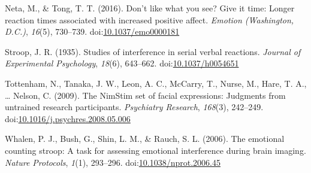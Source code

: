 \documentclass[man]{apa6}
\begin{document}
\leavevmode\hypertarget{ref-neta_dont_2016}{}%
Neta, M., \& Tong, T. T. (2016). Don't like what you see? Give it time: Longer reaction times associated with increased positive affect. \emph{Emotion (Washington, D.C.)}, \emph{16}(5), 730--739. doi:\href{https://doi.org/10.1037/emo0000181}{10.1037/emo0000181}

\leavevmode\hypertarget{ref-stroop_studies_1935}{}%
Stroop, J. R. (1935). Studies of interference in serial verbal reactions. \emph{Journal of Experimental Psychology}, \emph{18}(6), 643--662. doi:\href{https://doi.org/10.1037/h0054651}{10.1037/h0054651}

\leavevmode\hypertarget{ref-tottenham_nimstim_2009}{}%
Tottenham, N., Tanaka, J. W., Leon, A. C., McCarry, T., Nurse, M., Hare, T. A., \ldots{} Nelson, C. (2009). The NimStim set of facial expressions: Judgments from untrained research participants. \emph{Psychiatry Research}, \emph{168}(3), 242--249. doi:\href{https://doi.org/10.1016/j.psychres.2008.05.006}{10.1016/j.psychres.2008.05.006}

\leavevmode\hypertarget{ref-whalen_emotional_2006}{}%
Whalen, P. J., Bush, G., Shin, L. M., \& Rauch, S. L. (2006). The emotional counting stroop: A task for assessing emotional interference during brain imaging. \emph{Nature Protocols}, \emph{1}(1), 293--296. doi:\href{https://doi.org/10.1038/nprot.2006.45}{10.1038/nprot.2006.45}

\endgroup
\end{document}
